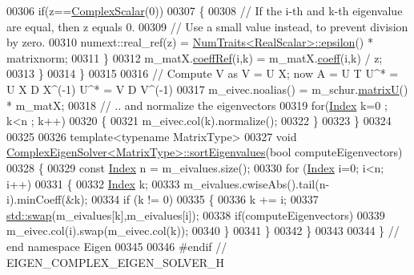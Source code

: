\begin{DoxyCode}
00306       \textcolor{keywordflow}{if}(z==\hyperlink{group___eigenvalues___module_a3604c99a69fac3bee42c88cb2b589143}{ComplexScalar}(0))
00307       \{
00308         \textcolor{comment}{// If the i-th and k-th eigenvalue are equal, then z equals 0.}
00309         \textcolor{comment}{// Use a small value instead, to prevent division by zero.}
00310         numext::real\_ref(z) = \hyperlink{group___core___module_struct_eigen_1_1_num_traits}{NumTraits<RealScalar>::epsilon}() * matrixnorm;
00311       \}
00312       m\_matX.\hyperlink{class_eigen_1_1_plain_object_base_a25626a55b26a4323565f79d1b7c48ea8}{coeffRef}(i,k) = m\_matX.\hyperlink{class_eigen_1_1_plain_object_base_afbfc12954f16d21aedb7bd839f64a278}{coeff}(i,k) / z;
00313     \}
00314   \}
00315 
00316   \textcolor{comment}{// Compute V as V = U X; now A = U T U^* = U X D X^(-1) U^* = V D V^(-1)}
00317   m\_eivec.noalias() = m\_schur.\hyperlink{group___eigenvalues___module_afed8177cf9836f032d42bdb6c6bc6e01}{matrixU}() * m\_matX;
00318   \textcolor{comment}{// .. and normalize the eigenvectors}
00319   \textcolor{keywordflow}{for}(\hyperlink{group___eigenvalues___module_abc0218d8b902af0d6c759bfc0a8a8d74}{Index} k=0 ; k<n ; k++)
00320   \{
00321     m\_eivec.col(k).normalize();
00322   \}
00323 \}
00324 
00325 
00326 \textcolor{keyword}{template}<\textcolor{keyword}{typename} MatrixType>
00327 \textcolor{keywordtype}{void} \hyperlink{group___eigenvalues___module_class_eigen_1_1_complex_eigen_solver}{ComplexEigenSolver<MatrixType>::sortEigenvalues}(\textcolor{keywordtype}{bool} 
      computeEigenvectors)
00328 \{
00329   \textcolor{keyword}{const} \hyperlink{group___eigenvalues___module_abc0218d8b902af0d6c759bfc0a8a8d74}{Index} n =  m\_eivalues.size();
00330   \textcolor{keywordflow}{for} (\hyperlink{group___eigenvalues___module_abc0218d8b902af0d6c759bfc0a8a8d74}{Index} i=0; i<n; i++)
00331   \{
00332     \hyperlink{group___eigenvalues___module_abc0218d8b902af0d6c759bfc0a8a8d74}{Index} k;
00333     m\_eivalues.cwiseAbs().tail(n-i).minCoeff(&k);
00334     \textcolor{keywordflow}{if} (k != 0)
00335     \{
00336       k += i;
00337       \hyperlink{endian_8c_a3ca5ecd34b04d6a243c054ac3a57f68d}{std::swap}(m\_eivalues[k],m\_eivalues[i]);
00338       \textcolor{keywordflow}{if}(computeEigenvectors)
00339     m\_eivec.col(i).swap(m\_eivec.col(k));
00340     \}
00341   \}
00342 \}
00343 
00344 \} \textcolor{comment}{// end namespace Eigen}
00345 
00346 \textcolor{preprocessor}{#endif // EIGEN\_COMPLEX\_EIGEN\_SOLVER\_H}
\end{DoxyCode}
